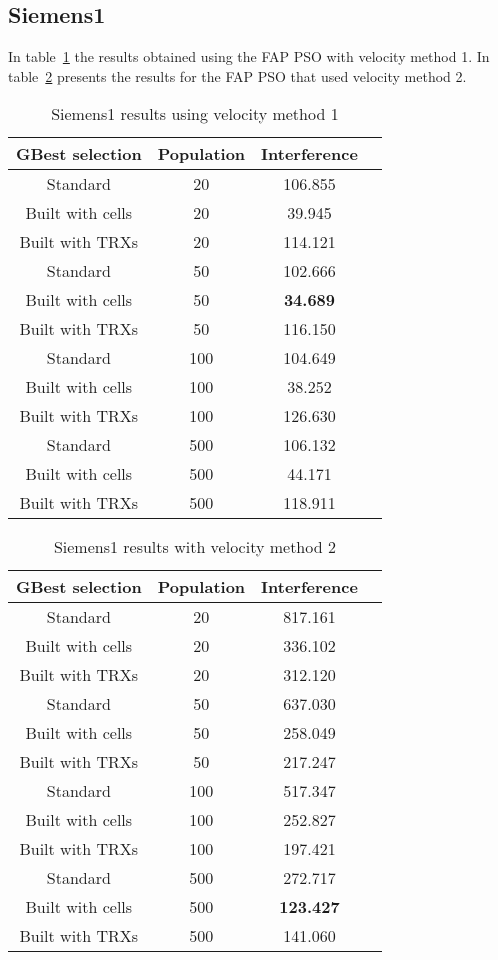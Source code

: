 \subsection{Siemens1}
In table~\ref{tab:siem1m1} the results obtained using the FAP PSO with velocity method 1. In table~\ref{tab:siem1m2} presents the results for the FAP PSO that used velocity method 2.
\begin{table}[H]
\centering
	\begin{tabular}{| c | c | c | c |}
	\hline
	GBest selection & Population & Interference\\ \hline
	Standard & 20 & 106.855\\ \hline
	Built with cells & 20 & 39.945\\ \hline
	Built with TRXs & 20 & 114.121\\ \hline
	Standard & 50 & 102.666\\ \hline
	Built with cells & 50 & \textbf{34.689}\\ \hline
	Built with TRXs & 50 & 116.150\\ \hline
	Standard & 100 & 104.649\\ \hline
	Built with cells & 100 & 38.252\\ \hline
	Built with TRXs & 100 & 126.630\\ \hline
	Standard & 500 & 106.132\\ \hline
	Built with cells & 500 & 44.171\\ \hline
	Built with TRXs & 500 & 118.911\\ \hline
	\end{tabular}
	\caption{Siemens1 results using velocity method 1}
	\label{tab:siem1m1}
\end{table}
\begin{table}[H]
\centering
	\begin{tabular}{| c | c | c | c |}
	\hline
	GBest selection & Population & Interference\\ \hline
	Standard & 20 & 817.161\\ \hline
	Built with cells & 20 & 336.102\\ \hline
	Built with TRXs & 20 & 312.120\\ \hline
	Standard & 50 & 637.030\\ \hline
	Built with cells & 50 & 258.049\\ \hline
	Built with TRXs & 50 & 217.247\\ \hline
	Standard & 100 & 517.347\\ \hline
	Built with cells & 100 & 252.827\\ \hline
	Built with TRXs & 100 & 197.421\\ \hline
	Standard & 500 & 272.717\\ \hline
	Built with cells & 500 & \textbf{123.427}\\ \hline
	Built with TRXs & 500 & 141.060\\ \hline
	\end{tabular}
	\caption{Siemens1 results with velocity method 2}
	\label{tab:siem1m2}
\end{table}
